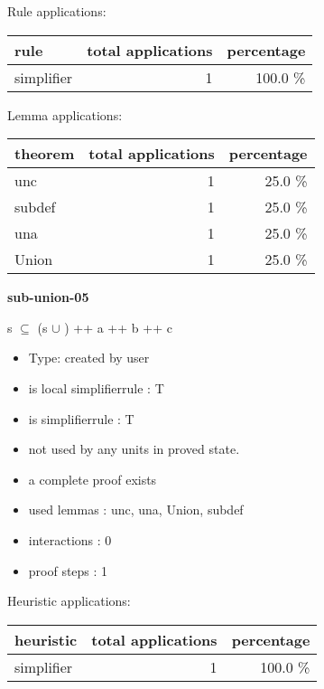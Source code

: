 \documentclass[a4paper]{article}
\begin{document}
Rule applications:

\begin{supertabular}{l|r|r}
rule	        & total applications & percentage \\ \hline
simplifier & 1 & 100.0 \% \\

\end{supertabular}

Lemma applications:

\begin{supertabular}{l|r|r}
theorem	        & total applications & percentage \\ \hline
unc & 1 & 25.0 \% \\
subdef & 1 & 25.0 \% \\
una & 1 & 25.0 \% \\
Union & 1 & 25.0 \% \\

\end{supertabular}
\pagebreak

{\LARGE\bf sub-union-05}\label{lemma-sub-union-05}

\medskip

 \Fol s $\subseteq$ (s $\cup$ ) ++ a ++ b ++ c

\begin{itemize}

\item Type: created by user

\item is local simplifierrule : T
\item is simplifierrule : T
\item not used by any units in proved state.
\item       a complete proof exists
\item       used lemmas  : unc, una, Union, subdef
\item       interactions : 0
\item       proof steps  : 1
\end{itemize}

\medskip


Heuristic applications:

\begin{supertabular}{l|r|r}
heuristic	& total applications & percentage \\ \hline
simplifier & 1 & 100.0 \% \\

\end{supertabular}
\end{document}

